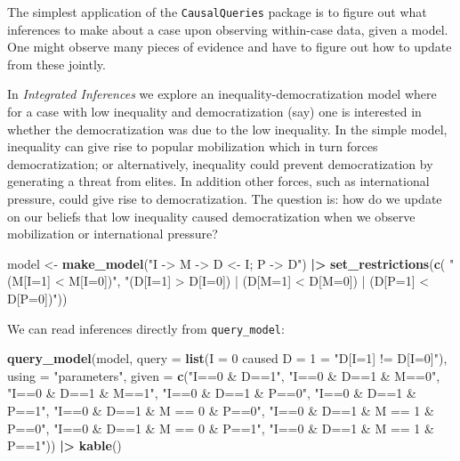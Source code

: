 \documentclass[
  12pt,
]{book}
\newenvironment{Shaded}{\begin{snugshade}}{\end{snugshade}}
\newcommand{\AttributeTok}[1]{\textcolor[rgb]{0.13,0.29,0.53}{#1}}
\newcommand{\FunctionTok}[1]{\textcolor[rgb]{0.13,0.29,0.53}{\textbf{#1}}}
\newcommand{\NormalTok}[1]{#1}
\newcommand{\OtherTok}[1]{\textcolor[rgb]{0.56,0.35,0.01}{#1}}
\newcommand{\SpecialCharTok}[1]{\textcolor[rgb]{0.81,0.36,0.00}{\textbf{#1}}}
\newcommand{\StringTok}[1]{\textcolor[rgb]{0.31,0.60,0.02}{#1}}
\begin{document}
The simplest application of the \texttt{CausalQueries} package is to figure out what inferences to make about a case upon observing within-case data, given a model. One might observe many pieces of evidence and have to figure out how to update from these jointly.

In \emph{Integrated Inferences} we explore an inequality-democratization model where for a case with low inequality and democratization (say) one is interested in whether the democratization was due to the low inequality. In the simple model, inequality can give rise to popular mobilization which in turn forces democratization; or alternatively, inequality could prevent democratization by generating a threat from elites. In addition other forces, such as international pressure, could give rise to democratization. The question is: how do we update on our beliefs that low inequality caused democratization when we observe mobilization or international pressure?

\begin{Shaded}
\begin{Highlighting}[]
\NormalTok{model }\OtherTok{\textless{}{-}} \FunctionTok{make\_model}\NormalTok{(}\StringTok{"I {-}\textgreater{} M {-}\textgreater{} D \textless{}{-} I; P {-}\textgreater{} D"}\NormalTok{) }\SpecialCharTok{|\textgreater{}} 
  \FunctionTok{set\_restrictions}\NormalTok{(}\FunctionTok{c}\NormalTok{( }
    \StringTok{"(M[I=1] \textless{} M[I=0])"}\NormalTok{, }
    \StringTok{"(D[I=1] \textgreater{} D[I=0]) | (D[M=1] \textless{} D[M=0]) | (D[P=1] \textless{} D[P=0])"}\NormalTok{)) }
\end{Highlighting}
\end{Shaded}

We can read inferences directly from \texttt{query\_model}:

\begin{Shaded}
\begin{Highlighting}[]
\FunctionTok{query\_model}\NormalTok{(model, }
            \AttributeTok{query =} \FunctionTok{list}\NormalTok{(}\StringTok{\textasciigrave{}}\AttributeTok{I = 0 caused D = 1}\StringTok{\textasciigrave{}} \OtherTok{=} \StringTok{"D[I=1] != D[I=0]"}\NormalTok{), }
            \AttributeTok{using =} \StringTok{"parameters"}\NormalTok{, }
            \AttributeTok{given =} \FunctionTok{c}\NormalTok{(}\StringTok{"I==0 \& D==1"}\NormalTok{, }
                       \StringTok{"I==0 \& D==1 \& M==0"}\NormalTok{, }
                       \StringTok{"I==0 \& D==1 \& M==1"}\NormalTok{, }
                       \StringTok{"I==0 \& D==1 \& P==0"}\NormalTok{, }
                       \StringTok{"I==0 \& D==1 \& P==1"}\NormalTok{, }
                       \StringTok{"I==0 \& D==1 \& M == 0 \& P==0"}\NormalTok{,}
                       \StringTok{"I==0 \& D==1 \& M == 1 \& P==0"}\NormalTok{,}
                       \StringTok{"I==0 \& D==1 \& M == 0 \& P==1"}\NormalTok{,}
                       \StringTok{"I==0 \& D==1 \& M == 1 \& P==1"}\NormalTok{)) }\SpecialCharTok{|\textgreater{}} \FunctionTok{kable}\NormalTok{()}
\end{Highlighting}
\end{Shaded}
\end{document}
